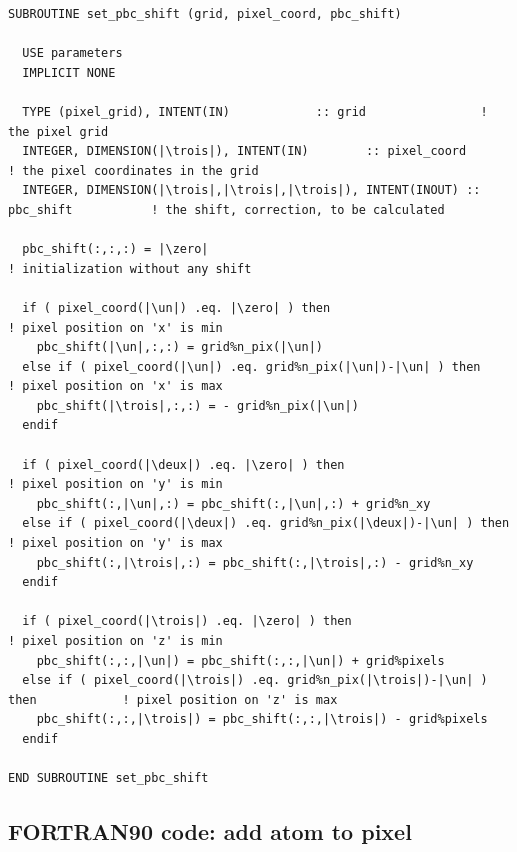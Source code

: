 \begin{lstlisting}[language={[90]FORTRAN}]
SUBROUTINE set_pbc_shift (grid, pixel_coord, pbc_shift)
  
  USE parameters
  IMPLICIT NONE
  
  TYPE (pixel_grid), INTENT(IN)            :: grid                ! the pixel grid
  INTEGER, DIMENSION(|\trois|), INTENT(IN)        :: pixel_coord         ! the pixel coordinates in the grid
  INTEGER, DIMENSION(|\trois|,|\trois|,|\trois|), INTENT(INOUT) :: pbc_shift           ! the shift, correction, to be calculated
  
  pbc_shift(:,:,:) = |\zero|                                            ! initialization without any shift

  if ( pixel_coord(|\un|) .eq. |\zero| ) then                               ! pixel position on 'x' is min
    pbc_shift(|\un|,:,:) = grid%n_pix(|\un|)
  else if ( pixel_coord(|\un|) .eq. grid%n_pix(|\un|)-|\un| ) then            ! pixel position on 'x' is max
    pbc_shift(|\trois|,:,:) = - grid%n_pix(|\un|)
  endif
  
  if ( pixel_coord(|\deux|) .eq. |\zero| ) then                               ! pixel position on 'y' is min
    pbc_shift(:,|\un|,:) = pbc_shift(:,|\un|,:) + grid%n_xy
  else if ( pixel_coord(|\deux|) .eq. grid%n_pix(|\deux|)-|\un| ) then            ! pixel position on 'y' is max
    pbc_shift(:,|\trois|,:) = pbc_shift(:,|\trois|,:) - grid%n_xy
  endif
  
  if ( pixel_coord(|\trois|) .eq. |\zero| ) then                               ! pixel position on 'z' is min
    pbc_shift(:,:,|\un|) = pbc_shift(:,:,|\un|) + grid%pixels
  else if ( pixel_coord(|\trois|) .eq. grid%n_pix(|\trois|)-|\un| ) then            ! pixel position on 'z' is max
    pbc_shift(:,:,|\trois|) = pbc_shift(:,:,|\trois|) - grid%pixels
  endif
  
END SUBROUTINE set_pbc_shift
\end{lstlisting}


\subsection{FORTRAN90 code: add atom to pixel}
\label{c-add-atom-pixel}

